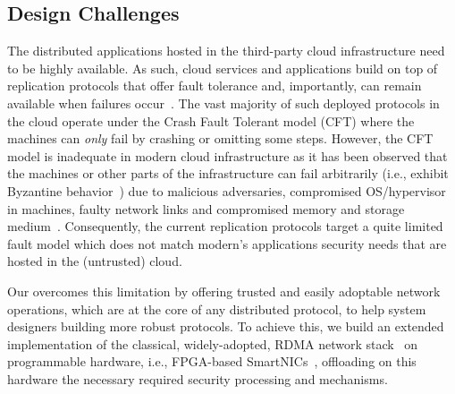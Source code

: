 
\subsection{Design Challenges}
 The distributed applications hosted in the third-party cloud infrastructure need to be highly available. As such, cloud services and applications build on top of replication protocols that offer fault tolerance and, importantly, can remain available when failures occur~\cite{Jimenez-Peris2001}. The vast majority of such deployed protocols in the cloud operate under the Crash Fault Tolerant model (CFT) where the machines can {\em only} fail by crashing or omitting some steps. However, the CFT model is inadequate in modern cloud infrastructure as it has been observed that the machines or other parts of the infrastructure can fail arbitrarily (i.e., exhibit Byzantine behavior~\cite{Lamport:1982}) due to malicious adversaries, compromised OS/hypervisor in machines, faulty network links and compromised memory and storage medium~\cite{Gunawi_bugs-in-the-cloud, ciad, fast-08-corruption, security-one-sided-communication, accountable-cloud}. Consequently, the current replication protocols target a quite limited fault model which does not match modern's applications security needs that are hosted in the (untrusted) cloud.

 Our \projecttitle{} overcomes this limitation by offering  trusted and easily adoptable network operations, which are at the core of any distributed protocol, to help system designers building more robust protocols. To achieve this, we build an extended implementation of the classical, widely-adopted, RDMA network stack~\cite{rdma} on programmable hardware, i.e., FPGA-based SmartNICs~\cite{u280_smartnics}, offloading on this hardware the necessary required security processing and mechanisms. 



